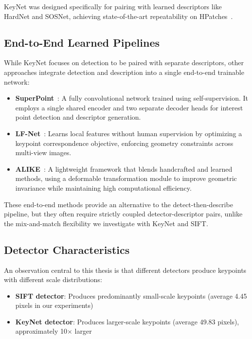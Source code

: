 KeyNet was designed specifically for pairing with learned descriptors like HardNet and SOSNet, achieving state-of-the-art repeatability on HPatches~\cite{barroso2019key}.

\subsection{End-to-End Learned Pipelines}

While KeyNet focuses on detection to be paired with separate descriptors, other approaches integrate detection and description into a single end-to-end trainable network:

\begin{itemize}
    \item \textbf{SuperPoint}~\cite{detone2018superpoint}: A fully convolutional network trained using self-supervision. It employs a single shared encoder and two separate decoder heads for interest point detection and descriptor generation.
    \item \textbf{LF-Net}~\cite{ono2018lf}: Learns local features without human supervision by optimizing a keypoint correspondence objective, enforcing geometry constraints across multi-view images.
    \item \textbf{ALIKE}~\cite{zhao2023aliked}: A lightweight framework that blends handcrafted and learned methods, using a deformable transformation module to improve geometric invariance while maintaining high computational efficiency.
\end{itemize}

These end-to-end methods provide an alternative to the detect-then-describe pipeline, but they often require strictly coupled detector-descriptor pairs, unlike the mix-and-match flexibility we investigate with KeyNet and SIFT.

\subsection{Detector Characteristics}

An observation central to this thesis is that different detectors produce keypoints with different scale distributions:

\begin{itemize}
    \item \textbf{SIFT detector}: Produces predominantly small-scale keypoints (average 4.45 pixels in our experiments)
    \item \textbf{KeyNet detector}: Produces larger-scale keypoints (average 49.83 pixels), approximately 10$\times$ larger
\end{itemize}

